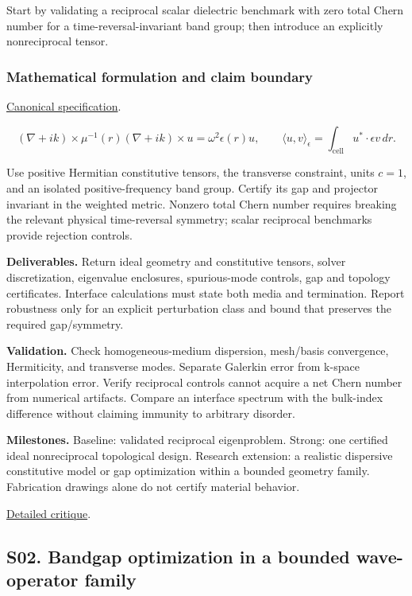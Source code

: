 \documentclass[
  11pt,
]{article}
\begin{document}
Start by validating a reciprocal scalar dielectric benchmark with zero
total Chern number for a time-reversal-invariant band group; then
introduce an explicitly nonreciprocal tensor.

\subsubsection{Mathematical formulation and claim boundary}

\href{https://github.com/rick-stevens-ai/Pure-Thought/blob/main/PRDs/11-Photonic-Topological-Crystals.md}{Canonical
specification}.

\[(\nabla+ik)\times\mu^{-1}(r)(\nabla+ik)\times u
=\omega^2\epsilon(r)u,\qquad
\langle u,v\rangle_\epsilon=\int_{\mathrm{cell}}u^*\cdot\epsilon v\,dr.\]

Use positive Hermitian constitutive tensors, the transverse constraint,
units \(c=1\), and an isolated positive-frequency band group. Certify
its gap and projector invariant in the weighted metric. Nonzero total
Chern number requires breaking the relevant physical time-reversal
symmetry; scalar reciprocal benchmarks provide rejection controls.

\textbf{Deliverables.} Return ideal geometry and constitutive tensors,
solver discretization, eigenvalue enclosures, spurious-mode controls,
gap and topology certificates. Interface calculations must state both
media and termination. Report robustness only for an explicit
perturbation class and bound that preserves the required gap/symmetry.

\textbf{Validation.} Check homogeneous-medium dispersion, mesh/basis
convergence, Hermiticity, and transverse modes. Separate Galerkin error
from k-space interpolation error. Verify reciprocal controls cannot
acquire a net Chern number from numerical artifacts. Compare an
interface spectrum with the bulk-index difference without claiming
immunity to arbitrary disorder.

\textbf{Milestones.} Baseline: validated reciprocal eigenproblem.
Strong: one certified ideal nonreciprocal topological design. Research
extension: a realistic dispersive constitutive model or gap optimization
within a bounded geometry family. Fabrication drawings alone do not
certify material behavior.

\href{https://github.com/rick-stevens-ai/Pure-Thought/blob/main/reviews/11-Photonic-Topological-Crystals.md}{Detailed
critique}.

\subsection{S02. Bandgap optimization in a bounded wave-operator family}
\end{document}
